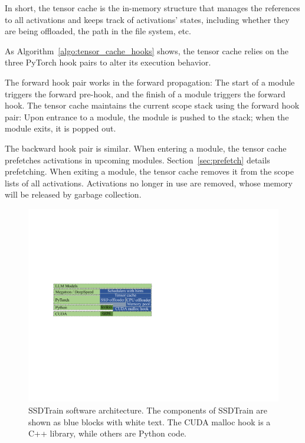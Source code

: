 In short, the tensor cache is the in-memory structure that manages the references to all activations and keeps track of activations' states, including whether they are being offloaded, the path in the file system, etc. 


As Algorithm~\ref{algo:tensor_cache_hooks} shows, the tensor cache relies on the three PyTorch hook pairs to alter its execution behavior.


The forward hook pair works in the forward propagation: The start of a module triggers the forward pre-hook, and the finish of a module triggers the forward hook. 
The tensor cache maintains the current scope stack using the forward hook pair: Upon entrance to a module, the module is pushed to the stack;
when the module exits, it is popped out.

The backward hook pair is similar. 
When entering a module, the tensor cache prefetches activations in upcoming modules. Section~\ref{sec:prefetch} details prefetching.
When exiting a module, the tensor cache removes it from the scope lists of all activations. Activations no longer in use are removed, whose memory will be released by garbage collection.


\begin{figure}[!t]
\centering
\includegraphics[width=0.85\linewidth]{figures/SSDTrain/software_arch_v2.pdf}
\caption{\label{fig:software_arch} SSDTrain software architecture. The components of SSDTrain are shown as blue blocks with white text. The CUDA malloc hook is a C++ library, while others are Python code.}
\end{figure}




